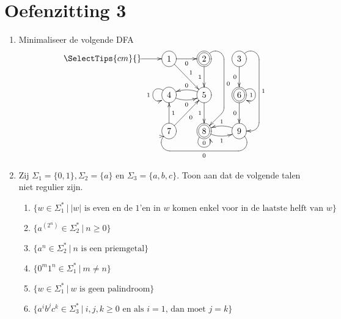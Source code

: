 \documentclass[a4paper]{article}
\begin{document}
\section*{Oefenzitting 3}

\begin{enumerate}
   \item Minimaliseer de volgende DFA \\
          \[  \entrymodifiers={++[o][F-]}
            \SelectTips{cm}{}
            \xymatrix {
              *{} \ar[r] &
              1               \ar[r]_0    \ar[rd]^1                              &
              *++[o][F=]{2}   \ar[d]_1    \ar `ur_r[dd]  `[dd] `_dl[dd]^0 [dd]     &
              3               \ar `ur_d[dd] `_l[dd]^1 [dd]   \ar[d]_0                               \\
              *{} &
              4               \ar@(lu,ld)[]_1   \ar@/_/[r]_0      &
              5               \ar[d]_1          \ar@/_/[l]_0      &
              *++[o][F=]{6}   \ar@(ru,rd)[]_1   \ar[d]_0          \\
              *{} &
              7               \ar[u]_1          \ar[ru]_0                     &
              *++[o][F=]{8}   \ar@(ld,rd)[]^0   \ar@/_/[r]_1                  &
             9                \ar@/_/[l]_1      \ar `dr_l[ll] `_ur[ll]^0 [ll]  \\
         } \]

   \item Zij $\Sigma_1 = \{0,1\}, \Sigma_2 = \{a\}$ en $\Sigma_3 = \{a,b,c\}$. Toon aan dat de volgende talen niet regulier zijn.
      \begin{enumerate}
         \item $\{ w \in \Sigma_1^*\ |\ \mbox{$\left|w\right|$ is even en de $1$'en in $w$ komen enkel voor in de laatste helft van $w$}\}$   %
         \item $\{ a^{\left( 2^n \right) } \in \Sigma_2^* \ | \ n \geq 0 \}$                                      %
         \item $\{ a^n \in \Sigma_2^*\ | \ \mbox{$n$ is een priemgetal} \}$                                       %
         \item $\{ 0^m1^n \in \Sigma_1^* \ | \ m \neq n \}$                                                       %
         \item $\{ w \in \Sigma_1^* \ | \ \mbox{$w$ is geen palindroom} \}$                                       %
         \item $\{ a^ib^jc^k \in \Sigma_3^* \ | \ \mbox{$i,j,k \geq 0$ en als $i = 1$, dan moet $j=k$} \}$        %
      \end{enumerate}
\end{enumerate}
\end{document}
